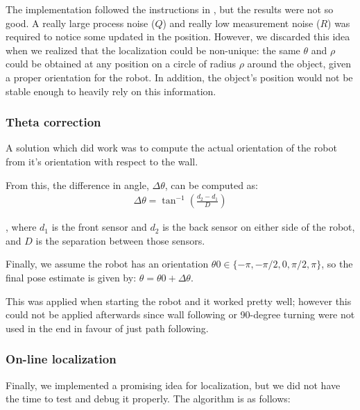 The implementation followed the instructions in \cite{Applied}, but the results were not so good. A really large process noise ($Q$) and really low measurement noise ($R$) was required to notice some updated in the position. However, we discarded this idea when we realized that the localization could be non-unique: the same $\theta$ and $\rho$ could be obtained at any position on a circle of radius $\rho$ around the object, given a proper orientation for the robot. In addition, the object's position would not be stable enough to heavily rely on this information. 

\subsubsection{Theta correction}
A solution which did work was to compute the actual orientation of the robot from it's orientation with respect to the wall. 

From this, the difference in angle, $\Delta\theta$, can be computed as:
\begin{align}
\label{eq:locTheta}
\Delta\theta = \tan^{-1}\left(\frac{d_2 - d_1}{D}\right)
\end{align}

, where $d_1$ is the front sensor and $d_2$ is the back sensor on either side of the robot, and $D$ is the separation between those sensors. 

Finally, we assume the robot has an orientation $\theta0 \in \{-\pi, -\pi/2, 0, \pi/2, \pi\}$, so the final pose estimate is given by: $\theta = \theta0 + \Delta\theta$.

This was applied when starting the robot and it worked pretty well; however this could not be applied afterwards since wall following or 90-degree turning were not used in the end in favour of just path following.  

\subsubsection{On-line localization}
Finally, we implemented a promising idea for localization, but we did not have the time to test and debug it properly. The algorithm is as follows:

